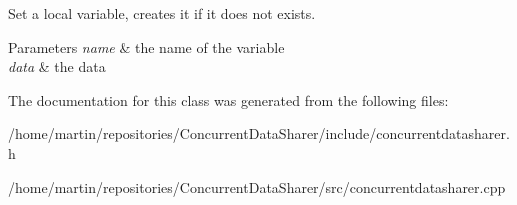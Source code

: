 Set a local variable, creates it if it does not exists. 


\begin{DoxyParams}{Parameters}
{\em name} & the name of the variable \\
\hline
{\em data} & the data \\
\hline
\end{DoxyParams}


The documentation for this class was generated from the following files\+:\begin{DoxyCompactItemize}
\item 
/home/martin/repositories/\+Concurrent\+Data\+Sharer/include/concurrentdatasharer.\+h\item 
/home/martin/repositories/\+Concurrent\+Data\+Sharer/src/concurrentdatasharer.\+cpp\end{DoxyCompactItemize}
